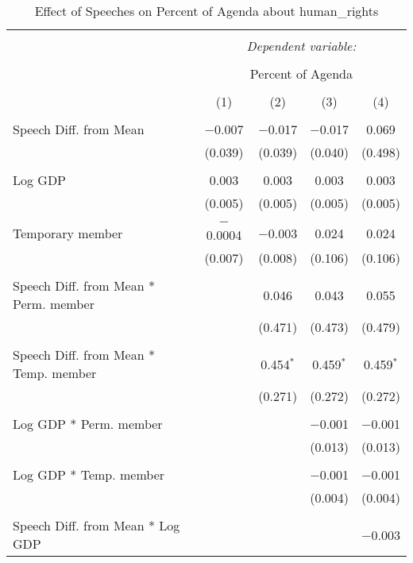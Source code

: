 
\begin{table}[!htbp] \centering 
  \caption{Effect of Speeches on Percent of Agenda about human_rights} 
  \label{} 
\begin{tabular}{@{\extracolsep{5pt}}lcccc} 
\\[-1.8ex]\hline 
\hline \\[-1.8ex] 
 & \multicolumn{4}{c}{\textit{Dependent variable:}} \\ 
\cline{2-5} 
\\[-1.8ex] & \multicolumn{4}{c}{Percent of Agenda} \\ 
\\[-1.8ex] & (1) & (2) & (3) & (4)\\ 
\hline \\[-1.8ex] 
 Speech Diff. from Mean & $-$0.007 & $-$0.017 & $-$0.017 & 0.069 \\ 
  & (0.039) & (0.039) & (0.040) & (0.498) \\ 
  & & & & \\ 
 Log GDP & 0.003 & 0.003 & 0.003 & 0.003 \\ 
  & (0.005) & (0.005) & (0.005) & (0.005) \\ 
  & & & & \\ 
 Temporary member & $-$0.0004 & $-$0.003 & 0.024 & 0.024 \\ 
  & (0.007) & (0.008) & (0.106) & (0.106) \\ 
  & & & & \\ 
 Speech Diff. from Mean * Perm. member &  & 0.046 & 0.043 & 0.055 \\ 
  &  & (0.471) & (0.473) & (0.479) \\ 
  & & & & \\ 
 Speech Diff. from Mean * Temp. member &  & 0.454$^{*}$ & 0.459$^{*}$ & 0.459$^{*}$ \\ 
  &  & (0.271) & (0.272) & (0.272) \\ 
  & & & & \\ 
 Log GDP * Perm. member &  &  & $-$0.001 & $-$0.001 \\ 
  &  &  & (0.013) & (0.013) \\ 
  & & & & \\ 
 Log GDP * Temp. member &  &  & $-$0.001 & $-$0.001 \\ 
  &  &  & (0.004) & (0.004) \\ 
  & & & & \\ 
 Speech Diff. from Mean * Log GDP &  &  &  & $-$0.003 \\ 

\end{tabular}
\end{table}
